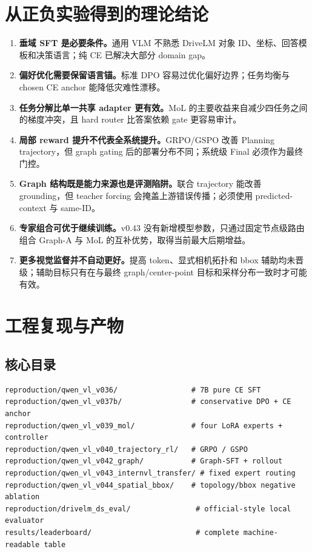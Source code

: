 \documentclass[UTF8,a4paper,11pt]{ctexart}
\begin{document}
\section{从正负实验得到的理论结论}
\begin{enumerate}
  \item \textbf{垂域 SFT 是必要条件。}通用 VLM 不熟悉 DriveLM 对象 ID、坐标、回答模板和决策语言；纯 CE 已解决大部分 domain gap。
  \item \textbf{偏好优化需要保留语言锚。}标准 DPO 容易过优化偏好边界；任务均衡与 chosen CE anchor 能降低灾难性漂移。
  \item \textbf{任务分解比单一共享 adapter 更有效。}MoL 的主要收益来自减少四任务之间的梯度冲突，且 hard router 比答案依赖 gate 更容易审计。
  \item \textbf{局部 reward 提升不代表全系统提升。}GRPO/GSPO 改善 Planning trajectory，但 graph gating 后的部署分布不同；系统级 Final 必须作为最终门控。
  \item \textbf{Graph 结构既是能力来源也是评测陷阱。}联合 trajectory 能改善 grounding，但 teacher forcing 会掩盖上游错误传播；必须使用 predicted-context 与 same-ID。
  \item \textbf{专家组合可优于继续训练。}v0.43 没有新增模型参数，只通过固定节点级路由组合 Graph-A 与 MoL 的互补优势，取得当前最大后期增益。
  \item \textbf{更多视觉监督并不自动更好。}提高 token、显式相机拓扑和 bbox 辅助均未晋级；辅助目标只有在与最终 graph/center-point 目标和采样分布一致时才可能有效。
\end{enumerate}

\section{工程复现与产物}
\subsection{核心目录}
\begin{lstlisting}
reproduction/qwen_vl_v036/                 # 7B pure CE SFT
reproduction/qwen_vl_v037b/                # conservative DPO + CE anchor
reproduction/qwen_vl_v039_mol/             # four LoRA experts + controller
reproduction/qwen_vl_v040_trajectory_rl/   # GRPO / GSPO
reproduction/qwen_vl_v042_graph/           # Graph-SFT + rollout
reproduction/qwen_vl_v043_internvl_transfer/ # fixed expert routing
reproduction/qwen_vl_v044_spatial_bbox/    # topology/bbox negative ablation
reproduction/drivelm_ds_eval/               # official-style local evaluator
results/leaderboard/                        # complete machine-readable table
\end{lstlisting}
\end{document}
